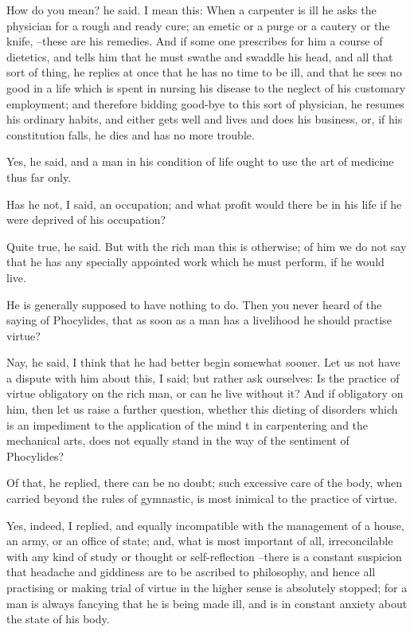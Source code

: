 How do you mean? he said.
I mean this: When a carpenter is ill he asks the physician for a rough and ready cure; an emetic or a purge or a cautery or the knife, --these are his remedies. And if some one prescribes for him a course of dietetics, and tells him that he must swathe and swaddle his head, and all that sort of thing, he replies at once that he has no time to be ill, and that he sees no good in a life which is spent in nursing his disease to the neglect of his customary employment; and therefore bidding good-bye to this sort of physician, he resumes his ordinary habits, and either gets well and lives and does his business, or, if his constitution falls, he dies and has no more trouble.

Yes, he said, and a man in his condition of life ought to use the art of medicine thus far only.

Has he not, I said, an occupation; and what profit would there be in his life if he were deprived of his occupation?

Quite true, he said.
But with the rich man this is otherwise; of him we do not say that he has any specially appointed work which he must perform, if he would live.

He is generally supposed to have nothing to do.
Then you never heard of the saying of Phocylides, that as soon as a man has a livelihood he should practise virtue?

Nay, he said, I think that he had better begin somewhat sooner.
Let us not have a dispute with him about this, I said; but rather ask ourselves: Is the practice of virtue obligatory on the rich man, or can he live without it? And if obligatory on him, then let us raise a further question, whether this dieting of disorders which is an impediment to the application of the mind t in carpentering and the mechanical arts, does not equally stand in the way of the sentiment of Phocylides?

Of that, he replied, there can be no doubt; such excessive care of the body, when carried beyond the rules of gymnastic, is most inimical to the practice of virtue.

Yes, indeed, I replied, and equally incompatible with the management of a house, an army, or an office of state; and, what is most important of all, irreconcilable with any kind of study or thought or self-reflection --there is a constant suspicion that headache and giddiness are to be ascribed to philosophy, and hence all practising or making trial of virtue in the higher sense is absolutely stopped; for a man is always fancying that he is being made ill, and is in constant anxiety about the state of his body.

